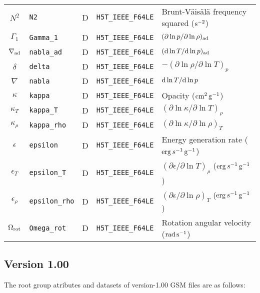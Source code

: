 \documentclass{article}
\newcommand{\diff}{\ensuremath{{\rm d}}}
\newcommand{\cm}{\ensuremath{{\rm cm}}}
\newcommand{\gram}{\ensuremath{{\rm g}}}
\newcommand{\second}{\ensuremath{{\rm s}}}
\newcommand{\erg}{\ensuremath{{\rm erg}}}
\begin{document}
\begin{table}[h!]
\begin{tabular}{|c|l|c|l|l|}
$N^{2}$           & \texttt{N2}           & D & \texttt{H5T\_IEEE\_F64LE} & Brunt-V\"ais\"al\"a frequency squared ($\second^{-2}$) \\
$\Gamma_{1}$      & \texttt{Gamma\_1}      & D & \texttt{H5T\_IEEE\_F64LE} & $(\partial \ln p/\partial \ln \rho)_{\rm ad}$ \\
$\nabla_{\rm ad}$  & \texttt{nabla\_ad}      & D & \texttt{H5T\_IEEE\_F64LE} & $(\diff \ln T/\diff \ln p)_{\rm ad}$ \\
$\delta$      & \texttt{delta}            & D & \texttt{H5T\_IEEE\_F64LE} & $-(\partial \ln \rho/\partial \ln T)_{p}$  \\
$\nabla$          & \texttt{nabla}        & D & \texttt{H5T\_IEEE\_F64LE} & $\diff \ln T/\diff \ln p$ \\
$\kappa$          & \texttt{kappa}       & D &  \texttt{H5T\_IEEE\_F64LE} & Opacity ($\cm^{2}\,\gram^{-1}$) \\
$\kappa_{T}$      & \texttt{kappa\_T}     & D &  \texttt{H5T\_IEEE\_F64LE} & $(\partial \ln \kappa/\partial \ln T)_{\rho}$ \\
$\kappa_{\rho}$   & \texttt{kappa\_rho}   & D &  \texttt{H5T\_IEEE\_F64LE} & $(\partial \ln \kappa/\partial \ln \rho)_{T}$ \\
$\epsilon$        & \texttt{epsilon}      & D &  \texttt{H5T\_IEEE\_F64LE} & Energy generation rate ($\erg\,s^{-1}\,\gram^{-1}$) \\
$\epsilon_{T}$    & \texttt{epsilon\_T}   & D &  \texttt{H5T\_IEEE\_F64LE} & $(\partial \epsilon/\partial \ln T)_{\rho}$ ($\erg\,s^{-1}\,\gram^{-1}$) \\
$\epsilon_{\rho}$ & \texttt{epsilon\_rho} & D &  \texttt{H5T\_IEEE\_F64LE} & $(\partial \epsilon/\partial \ln \rho)_{T}$ ($\erg\,s^{-1}\,\gram^{-1}$) \\
$\Omega_{\rm rot}$ & \texttt{Omega\_rot}   & D & \texttt{H5T\_IEEE\_F64LE} & Rotation angular velocity (${\rm rad}\,\second^{-1}$) \\  \hline
\end{tabular}
\end{table}

\subsection*{Version 1.00}

The root group atributes and datasets of version-1.00 GSM files are as follows:
\end{document}
